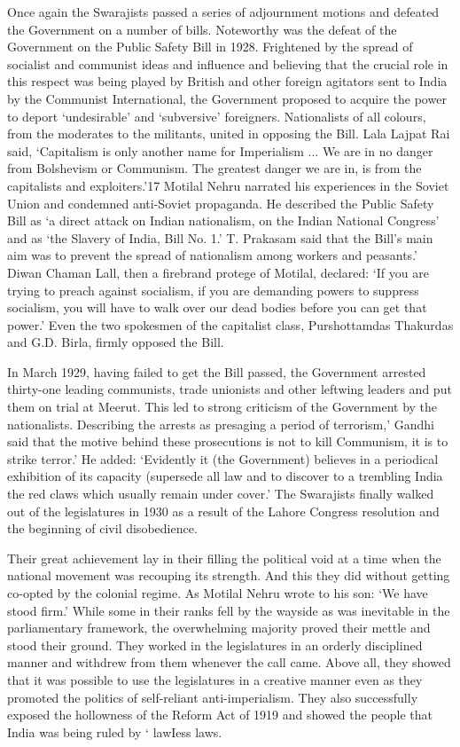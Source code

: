 \begin{multicols}{2}
Once again the Swarajists passed a series of adjournment motions and defeated the Government on a number of bills. Noteworthy was the defeat of the Government on the Public Safety Bill in 1928. Frightened by the spread of socialist and communist ideas and influence and believing that the crucial role in this respect was being played by British and other foreign agitators sent to India by the Communist International, the Government proposed to acquire the power to deport `undesirable' and `subversive' foreigners. Nationalists of all colours, from the moderates to the militants, united in opposing the Bill. Lala Lajpat Rai said, `Capitalism is only another name for Imperialism ... We are in no danger from Bolshevism or Communism. The greatest danger we are in, is from the capitalists and exploiters.'17 Motilal Nehru narrated his experiences in the Soviet Union and condemned anti-Soviet propaganda. He described the Public Safety Bill as `a direct attack on Indian nationalism, on the Indian National Congress' and as `the Slavery of India, Bill No. 1.' T. Prakasam said that the Bill's main aim was to prevent the spread of nationalism among workers and peasants.' Diwan Chaman Lall, then a firebrand protege of Motilal, declared: `If you are trying to preach against socialism, if you are demanding powers to suppress socialism, you will have to walk over our dead bodies before you can get that power.' Even the two spokesmen of the capitalist class, Purshottamdas Thakurdas and G.D. Birla, firmly opposed the Bill.

In March 1929, having failed to get the Bill passed, the Government arrested thirty-one leading communists, trade unionists and other leftwing leaders and put them on trial at Meerut. This led to strong criticism of the Government by the nationalists. Describing the arrests as presaging a period of terrorism,' Gandhi said that the motive behind these prosecutions is not to kill Communism, it is to strike terror.' He added: `Evidently it (the Government) believes in a periodical exhibition of its capacity (supersede all law and to discover to a trembling India the red claws which usually remain under cover.' The Swarajists finally walked out of the legislatures in 1930 as a result of the Lahore Congress resolution and the beginning of civil disobedience.

Their great achievement lay in their filling the political void at a time when the national movement was recouping its strength. And this they did without getting co-opted by the colonial regime. As Motilal Nehru wrote to his son: `We have stood firm.' While some in their ranks fell by the wayside as was inevitable in the parliamentary framework, the overwhelming majority proved their mettle and stood their ground. They worked in the legislatures in an orderly disciplined manner and withdrew from them whenever the call came. Above all, they showed that it was possible to use the legislatures in a creative manner even as they promoted the politics of self-reliant anti-imperialism. They also successfully exposed the hollowness of the Reform Act of 1919 and showed the people that India was being ruled by ` lawIess laws.


\end{multicols}
